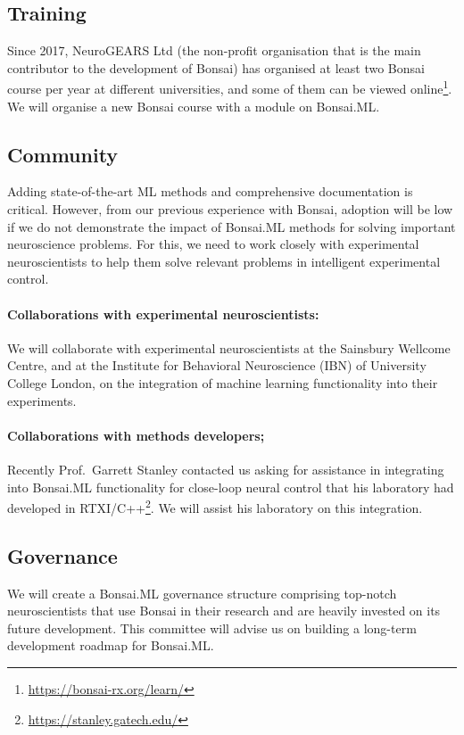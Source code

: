 \subsection*{Training}

Since 2017, NeuroGEARS Ltd (the non-profit organisation that is the main
contributor to the development of Bonsai) has organised at least two Bonsai
course per year at different universities, and some of them can be viewed
online\footnote[5]{\url{https://bonsai-rx.org/learn/}}. We will organise a new
Bonsai course with a module on Bonsai.ML.

\subsection*{Community}

Adding state-of-the-art ML methods and comprehensive documentation is critical.
However, from our previous experience with Bonsai, adoption will be low if we
do not demonstrate the impact of Bonsai.ML methods for solving important
neuroscience problems.
%
For this, we need to work closely with experimental neuroscientists to help
them solve relevant problems in intelligent experimental control.

\paragraph{Collaborations with experimental neuroscientists:} We will
collaborate with experimental neuroscientists at the Sainsbury Wellcome Centre,
and at the Institute for Behavioral Neuroscience (IBN) of University College London,
on the integration of machine learning functionality into their experiments.

\paragraph{Collaborations with methods developers;} Recently Prof.~Garrett
Stanley contacted us asking for assistance in integrating into Bonsai.ML
functionality for close-loop neural control that his laboratory had developed
in RTXI/C++\footnote[6]{\url{https://stanley.gatech.edu/}}. We will assist his
laboratory on this integration.

\subsection*{Governance}

We will create a Bonsai.ML governance structure comprising top-notch
neuroscientists that use Bonsai in their research and are heavily invested on
its future development.
%
This committee will advise us on building a long-term development roadmap for
Bonsai.ML.
